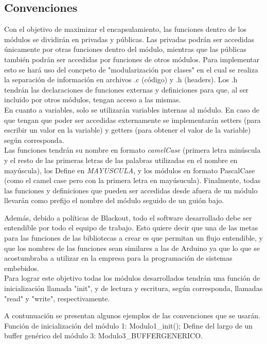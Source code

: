 \subsection{Convenciones}
Con el objetivo de maximizar el encapsulamiento, las funciones dentro de los módulos se dividirán en privadas y públicas. Las privadas podrán ser accedidas únicamente por otras funciones dentro del módulo, mientras que las públicas también podrán ser accedidas por funciones de otros módulos. Para implementar esto se hará uso del concpeto de "modularización por clases" \cite{sec2_6_2-1} en el cual se realiza la separación de información en archivos .c (código) y .h (headers). Los .h tendrán las declaraciones de funciones externas y definiciones para que, al ser incluido por otros módulos, tengan acceso a las mismas.\\
En cuanto a variables, solo se utilizarán variables internas al módulo. En caso de que tengan que poder ser accedidas externamente se implementarán setters (para escribir un valor en la variable) y getters (para obtener el valor de la variable) según corresponda.\\
Las funciones tendrán su nombre en formato \textit{camelCase} (primera letra minúscula y el resto de las primeras letras de las palabras utilizadas en el nombre en mayúscula), los Define en \textit{MAYUSCULA}, y los módulos en formato PascalCase (como el camel case pero con la primera letra en mayúsucula).
Finalmente, todas las funciones y definiciones que pueden ser accedidas desde afuera de un módulo llevarán como prefijo el nombre del módulo seguido de un guión bajo. 

Además, debido a políticas de Blackout, todo el software desarrollado debe ser entendible por todo el equipo de trabajo. Esto quiere decir que una de las metas para las funciones de las bibliotecas a crear es que permitan un flujo entendible, y que los nombres de las funciones sean similares a las de Arduino ya que lo que se acostumbraba a utilizar en la empresa para la programación de sistemas embebidos.\\
Para lograr este objetivo todas los módulos desarrollados tendrán una función de inicialización llamada "init", y de lectura y escritura, según corresponda, llamadas "read" y "write", respectivamente. 

A contunuación se presentan algunos ejemplos de las convenciones que se usarán. Función de inicialización del módulo 1: Modulo1\_init(); Define del largo de un buffer genérico del módulo 3: Modulo3\_BUFFERGENERICO.


